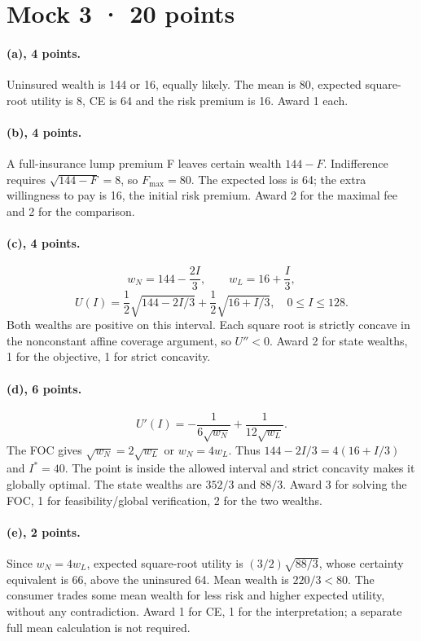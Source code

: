 \clearpage
\section*{Mock 3 · 20 points}
\paragraph{(a), 4 points.}
Uninsured wealth is 144 or 16, equally likely. The mean is 80, expected
square-root utility is 8, CE is 64 and the risk premium is 16. Award 1 each.

\paragraph{(b), 4 points.}
A full-insurance lump premium F leaves certain wealth $144-F$.
Indifference requires $\sqrt{144-F}=8$, so $F_{\max}=80$.
The expected loss is 64; the extra willingness to pay is 16, the initial
risk premium. Award 2 for the maximal fee and 2 for the comparison.

\paragraph{(c), 4 points.}
\[
 w_N=144-\frac{2I}{3},\qquad w_L=16+\frac I3,
\]
\[
 U(I)=\frac12\sqrt{144-2I/3}+\frac12\sqrt{16+I/3},\quad0\le I\le128.
\]
Both wealths are positive on this interval. Each square root is strictly
concave in the nonconstant affine coverage argument, so $U''<0$.
Award 2 for state wealths, 1 for the objective, 1 for strict concavity.

\paragraph{(d), 6 points.}
\[
 U'(I)=-\frac1{6\sqrt{w_N}}+\frac1{12\sqrt{w_L}}.
\]
The FOC gives $\sqrt{w_N}=2\sqrt{w_L}$ or $w_N=4w_L$.
Thus $144-2I/3=4(16+I/3)$ and $I^*=40$.
The point is inside the allowed interval and strict concavity makes it
globally optimal. The state wealths are $352/3$ and $88/3$.
Award 3 for solving the FOC, 1 for feasibility/global verification,
2 for the two wealths.

\paragraph{(e), 2 points.}
Since $w_N=4w_L$, expected square-root utility is
$(3/2)\sqrt{88/3}$, whose certainty equivalent is 66, above the uninsured 64.
Mean wealth is $220/3<80$. The consumer trades some mean wealth for less
risk and higher expected utility, without any contradiction. Award 1 for CE,
1 for the interpretation; a separate full mean calculation is not required.
